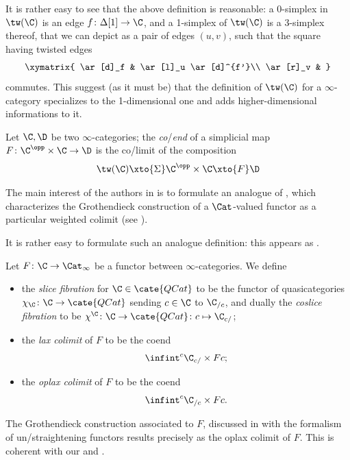\begin{remark}
It is rather easy to see that the above definition is reasonable: a 0-simplex in $\tw(\C)$ is an edge $f \colon \Delta[1]\to \C$, and a 1-simplex of $\tw(\C)$ is a 3-simplex thereof, that we can depict as a pair of edges $(u,v)$, such that the square having twisted edges
\[
\xymatrix{
	\ar[d]_f & \ar[l]_u \ar[d]^{f'}\\
	\ar[r]_v &
}
\]
commutes. This suggest (as it must be) that the definition of $\tw(\C)$ for a $\infty$-category specializes to the 1-dimensional one and adds higher-dimensional informations to it.
\end{remark}
\begin{definition}\label{infend}
Let $\C,\D$ be two $\infty$-categories; the \emph{co}/\emph{end} of a simplicial map $F\colon \C^\opp\times \C\to \D$ is the co/limit of the composition 
\[
\tw(\C)\xto{\Sigma} \C^\opp\times \C \xto{F} \D
\]
\end{definition}
The main interest of the authors in \cite{gepner2015lax} is to formulate an analogue of , which characterizes the Grothendieck construction of a $\Cat$-valued functor as a particular weighted colimit (see ).

It is rather easy to formulate such an analogue definition: this appears as \cite[\adef \textbf{2.8}]{gepner2015lax}.
\begin{definition}
Let $F\colon \C\to \Cat_\infty$ be a functor between $\infty$-categories. We define
\begin{itemize}
\item the \emph{slice fibration} for $\C \in\cate{QCat}$ to be the functor of quasicategories $\chi_\C \colon \C \to \cate{QCat}$ sending $c\in\C$ to $\C_{/c}$, and dually the \emph{coslice fibration} to be $\chi^\C \colon \C \to \cate{QCat} \colon c \mapsto \C_{c/}$;
\item the \emph{lax colimit} of $F$ to be the coend
\[
\infint^c \C_{c/}\times Fc;
\]
\item the \emph{oplax colimit} of $F$ to be the coend
\[
\infint^c \C_{/c}\times Fc.
\]
\end{itemize}
\end{definition}
The Grothendieck construction associated to $F$, discussed in \cite{HTT} with the formalism of un/straightening functors results precisely as the oplax colimit of $F$. This is coherent with our  and .
